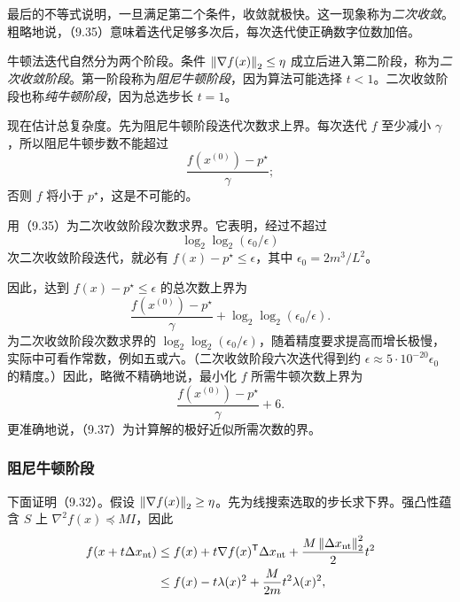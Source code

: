 最后的不等式说明，一旦满足第二个条件，收敛就极快。这一现象称为\emph{二次收敛}。粗略地说，（9.35）意味着迭代足够多次后，每次迭代使正确数字位数加倍。

牛顿法迭代自然分为两个阶段。条件 $\left\lVert \nabla f(x)\right\rVert_2\le\eta$ 成立后进入第二阶段，称为\emph{二次收敛阶段}。第一阶段称为\emph{阻尼牛顿阶段}，因为算法可能选择 $t<1$。二次收敛阶段也称\emph{纯牛顿阶段}，因为总选步长 $t=1$。

现在估计总复杂度。先为阻尼牛顿阶段迭代次数求上界。每次迭代 $f$ 至少减小 $\gamma$，所以阻尼牛顿步数不能超过
\[
\frac{f(x^{(0)})-p^\star}{\gamma};
\]
否则 $f$ 将小于 $p^\star$，这是不可能的。

用（9.35）为二次收敛阶段次数求界。它表明，经过不超过
\[
\log_2\log_2(\epsilon_0/\epsilon)
\]
次二次收敛阶段迭代，就必有 $f(x)-p^\star\le\epsilon$，其中 $\epsilon_0=2m^3/L^2$。

因此，达到 $f(x)-p^\star\le\epsilon$ 的总次数上界为
\begin{equation}
\frac{f(x^{(0)})-p^\star}{\gamma}
+\log_2\log_2(\epsilon_0/\epsilon).\tag{9.36}
\end{equation}
为二次收敛阶段次数求界的 $\log_2\log_2(\epsilon_0/\epsilon)$，随着精度要求提高而增长极慢，实际中可看作常数，例如五或六。（二次收敛阶段六次迭代得到约 $\epsilon\approx5\cdot10^{-20}\epsilon_0$ 的精度。）因此，略微不精确地说，最小化 $f$ 所需牛顿次数上界为
\begin{equation}
\frac{f(x^{(0)})-p^\star}{\gamma}+6.\tag{9.37}
\end{equation}
更准确地说，（9.37）为计算解的极好近似所需次数的界。

\subsubsection*{阻尼牛顿阶段}
下面证明（9.32）。假设 $\left\lVert \nabla f(x)\right\rVert_2\ge\eta$。先为线搜索选取的步长求下界。强凸性蕴含 $S$ 上 $\nabla^2f(x)\preceq MI$，因此
\[
\begin{aligned}
f(x+t\Delta x_{\mathrm{nt}})
&\le f(x)+t\nabla f(x)^\mathsf T\Delta x_{\mathrm{nt}}
+\frac{M\left\lVert \Delta x_{\mathrm{nt}}\right\rVert_2^2}{2}t^2\\
&\le f(x)-t\lambda(x)^2+\frac M{2m}t^2\lambda(x)^2,
\end{aligned}
\]

